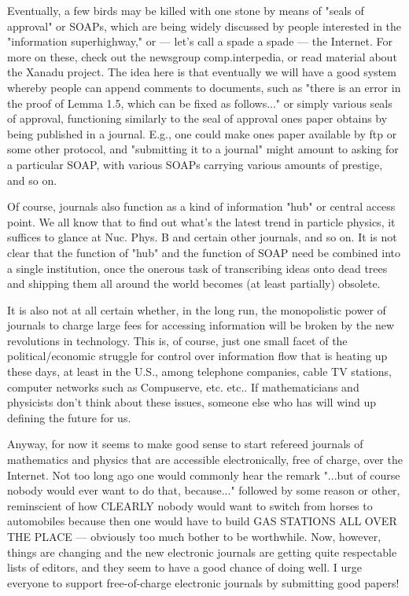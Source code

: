 Eventually, a few birds may be killed with one stone by means of "seals
of approval" or SOAPs, which are being widely discussed by people
interested in the "information superhighway," or --- let's call a spade
a spade --- the Internet.  For more on these, check out the newsgroup
comp.interpedia, or read material about the Xanadu project.  The idea
here is that eventually we will have a good system whereby people can
append comments to documents, such as "there is an error in the proof of
Lemma 1.5, which can be fixed as follows..." or simply various seals of
approval, functioning similarly to the seal of approval ones paper
obtains by being published in a journal.  E.g., one could make ones
paper available by ftp or some other protocol, and "submitting it to a
journal" might amount to asking for a particular SOAP, with various
SOAPs carrying various amounts of prestige, and so on.

Of course, journals also function as a kind of information "hub" or
central access point.  We all know that to find out what's the latest
trend in particle physics, it suffices to glance at Nuc. Phys. B and
certain other journals, and so on.  It is not clear that the function of
"hub" and the function of SOAP need be combined into a single
institution, once the onerous task of transcribing ideas onto dead
trees and shipping them all around the world becomes (at least partially)
obsolete.

It is also not at all certain whether, in the long run, the monopolistic
power of journals to charge large fees for accessing information will be
broken by the new revolutions in technology.  This is, of course, just
one small facet of the political/economic struggle for control over
information flow that is heating up these days, at least in the U.S.,
among telephone companies, cable TV stations, computer networks such as
Compuserve, etc.  etc..  If mathematicians and physicists don't think
about these issues, someone else who has will wind up defining the
future for us.

Anyway, for now it seems to make good sense to start refereed journals
of mathematics and physics that are accessible electronically, free of
charge, over the Internet.  Not too long ago one would commonly hear the
remark "...but of course nobody would ever want to do that, because..."
followed by some reason or other, reminscient of how CLEARLY nobody
would want to switch from horses to automobiles because then one would
have to build GAS STATIONS ALL OVER THE PLACE --- obviously too much
bother to be worthwhile.  Now, however, things are changing and the new 
electronic journals are getting quite respectable lists of editors, and
they seem to have a good chance of doing well.  I urge everyone to
support free-of-charge electronic journals by submitting good papers!

